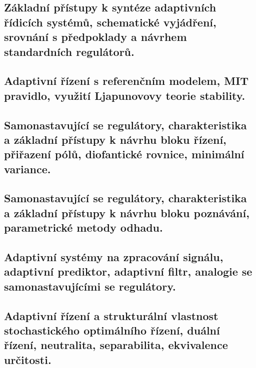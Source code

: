 \subsection{Základní přístupy k syntéze adaptivních řídicích systémů, schematické vyjádření, srovnání s předpoklady a návrhem standardních regulátorů.}

\subsection{Adaptivní řízení s referenčním modelem, MIT pravidlo, využití Ljapunovovy teorie stability.}

\subsection{Samonastavující se regulátory, charakteristika a základní přístupy k návrhu bloku řízení, přiřazení pólů, diofantické rovnice, minimální variance.}

\subsection{Samonastavující se regulátory, charakteristika a základní přístupy k návrhu bloku poznávání, parametrické metody odhadu.}

\subsection{Adaptivní systémy na zpracování signálu, adaptivní prediktor, adaptivní filtr, analogie se samonastavujícími se regulátory.}

\subsection{Adaptivní řízení a strukturální vlastnost stochastického optimálního řízení, duální řízení, neutralita, separabilita, ekvivalence určitosti.}